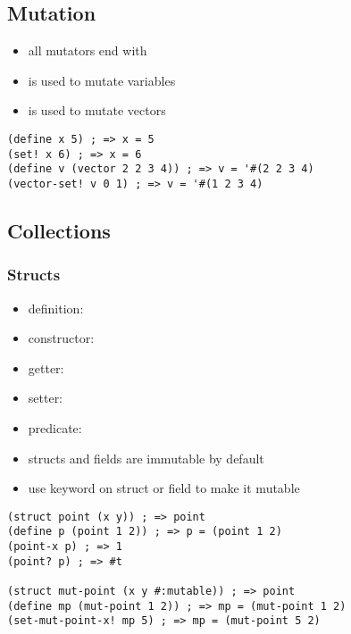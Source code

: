 \documentclass[a4paper,landscape,10pt]{article}
\begin{document}
\begin{multicols*}{2}
  \subsection{Mutation}

  \begin{itemize}
    \item all mutators end with \iracket{\!}
    \item {} is used to mutate variables
    \item {} is used to mutate vectors
  \end{itemize}

  \begin{lstlisting}[language=Racket]
(define x 5) ; => x = 5
(set! x 6) ; => x = 6
(define v (vector 2 2 3 4)) ; => v = '#(2 2 3 4)
(vector-set! v 0 1) ; => v = '#(1 2 3 4)
\end{lstlisting}

  \subsection{Collections}

  \subsubsection{Structs}

  \begin{itemize}
    \item definition: 
    \item constructor: 
    \item getter: 
    \item setter: 
    \item predicate: 
    \item structs and fields are immutable by default
    \item use  keyword on struct or field to make it mutable
  \end{itemize}

  \begin{lstlisting}[language=Racket]
(struct point (x y)) ; => point
(define p (point 1 2)) ; => p = (point 1 2)
(point-x p) ; => 1
(point? p) ; => #t

(struct mut-point (x y #:mutable)) ; => point
(define mp (mut-point 1 2)) ; => mp = (mut-point 1 2)
(set-mut-point-x! mp 5) ; => mp = (mut-point 5 2)
\end{lstlisting}


\end{multicols*}
\end{document}
